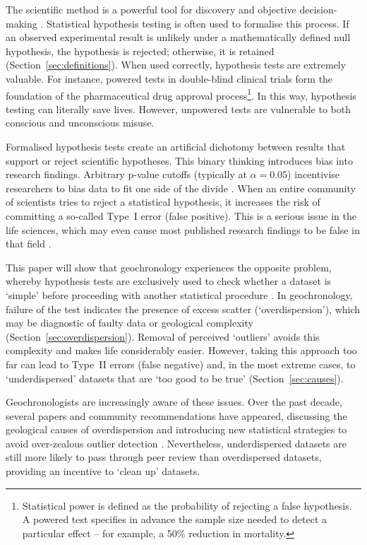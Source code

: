 \documentclass[gchron, manuscript]{copernicus}
\begin{document}
The scientific method is a powerful tool for discovery and objective
decision-making \citep{popper1959}. Statistical hypothesis testing is
often used to formalise this process. If an observed experimental
result is unlikely under a mathematically defined null hypothesis, the
hypothesis is rejected; otherwise, it is retained
(Section~\ref{sec:definitions}).  When used correctly, hypothesis
tests are extremely valuable. For instance, powered tests in
double-blind clinical trials form the foundation of the pharmaceutical
drug approval process\footnote{Statistical power is defined as the
probability of rejecting a false hypothesis. A powered test specifies
in advance the sample size needed to detect a particular effect -- for
example, a 50\% reduction in mortality.}.  In this way, hypothesis
testing can literally save lives. However, unpowered tests are
vulnerable to both conscious and unconscious misuse.\medskip

Formalised hypothesis tests create an artificial dichotomy between
results that support or reject scientific hypotheses. This binary
thinking introduces bias into research findings. Arbitrary p-value
cutoffs (typically at $\alpha = 0.05$) incentivise researchers to bias
data to fit one side of the divide \citep{amrhein2019}. When an entire
community of scientists tries to reject a statistical hypothesis, it
increases the risk of committing a so-called Type~I error (false
positive). This is a serious issue in the life sciences, which may
even cause most published research findings to be false in that field
\citep{ioannidis2005}.\medskip

This paper will show that geochronology experiences the opposite
problem, whereby hypothesis tests are exclusively used to check
whether a dataset is `simple' before proceeding with another
statistical procedure \citep{mcintyre1966}. In geochronology, failure
of the test indicates the presence of excess scatter
(`overdispersion'), which may be diagnostic of faulty data or
geological complexity (Section~\ref{sec:overdispersion}).  Removal of
perceived `outliers' avoids this complexity and makes life
considerably easier. However, taking this approach too far can lead to
Type~II errors (false negative) and, in the most extreme cases, to
`underdispersed' datasets that are `too good to be true'
(Section~\ref{sec:causes}).\medskip

Geochronologists are increasingly aware of these issues. Over the past
decade, several papers and community recommendations have appeared,
discussing the geological causes of overdispersion and introducing new
statistical strategies to avoid over-zealous outlier detection
\citep[e.g.,][]{horstwood2016,keller2018,klein2024,vermeesch2025c}.
Nevertheless, underdispersed datasets are still more likely to pass
through peer review than overdispersed datasets, providing an
incentive to `clean up' datasets.\medskip
\end{document}
